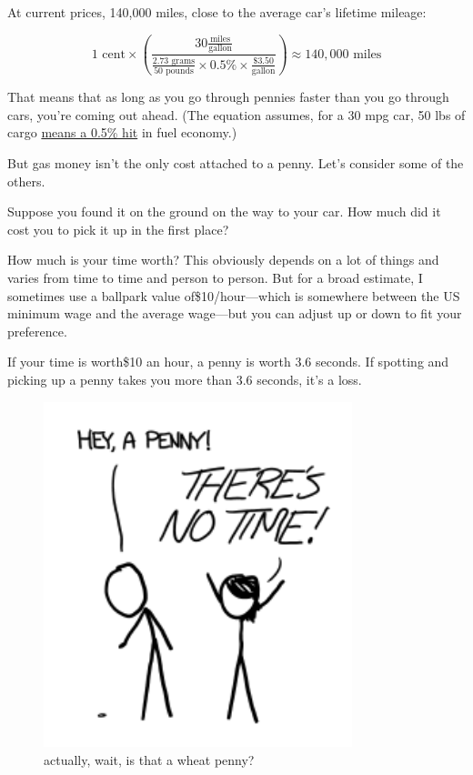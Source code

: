 \hfill{}

{At current prices, 140,000 miles, close to the average car’s lifetime mileage:}

{\[1\text{ cent}\times\left (\frac{30\frac{\text{miles}}{\text{gallon}}} {\frac{2.73\text{ grams}}{50\text{ pounds}}\times0.5\%\times\frac{\$3.50}{\text{gallon}}}\right)\approx140,000\text{ miles}\]}

{That means that as long as you go through pennies faster than you go through cars, you’re coming out ahead. (The equation assumes, for a 30 mpg car, 50 lbs of cargo \href{http://priuschat.com/threads/heavy-weight-drivers-effecting-mpg.41923/\#ixzz2Chj07sVA}{means a 0.5\% hit} in fuel economy.)}

{But gas money isn’t the only cost attached to a penny. Let’s consider some of the others.}

{Suppose you found it on the ground on the way to your car. How much did it cost you to pick it up in the first place?}

{How much is your time worth? This obviously depends on a lot of things and varies from time to time and person to person. But for a broad estimate, I sometimes use a ballpark value of\$10/hour—which is somewhere between the US minimum wage and the average wage—but you can adjust up or down to fit your preference.}

{If your time is worth\$10 an hour, a penny is worth 3.6 seconds. If spotting and picking up a penny takes you more than 3.6 seconds, it’s a loss.}

\begin{figure}[!htbp]
\centering
\includegraphics[scale=0.5, max width=0.8\textwidth]{imgs/a/22/pennies_notime.png}
\caption{actually, wait, is that a wheat penny?}
\end{figure}

